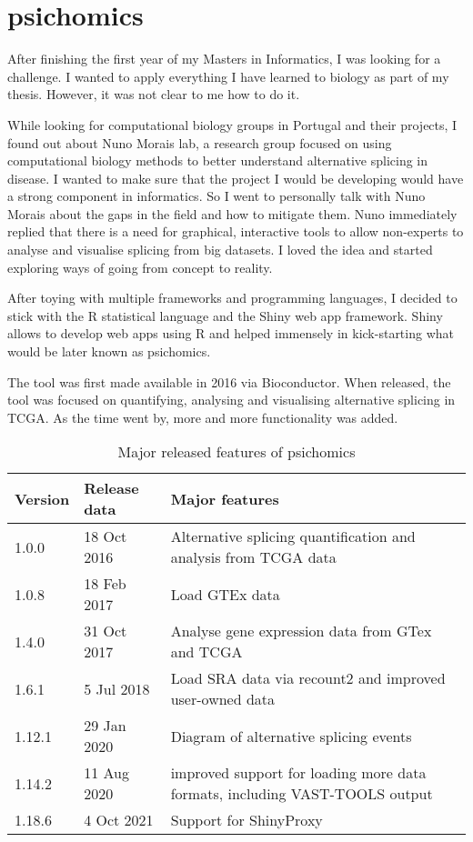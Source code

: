 \chapter{psichomics}

After finishing the first year of my Masters in Informatics, I was looking for a challenge. I wanted to apply everything I have learned to biology as part of my thesis. However, it was not clear to me how to do it.

While looking for computational biology groups in Portugal and their projects, I found out about Nuno Morais lab, a research group focused on using computational biology methods to better understand alternative splicing in disease. I wanted to make sure that the project I would be developing would have a strong component in informatics. So I went to personally talk with Nuno Morais about the gaps in the field and how to mitigate them. Nuno immediately replied that there is a need for graphical, interactive tools to allow non-experts to analyse and visualise splicing from big datasets. I loved the idea and started exploring ways of going from concept to reality.

After toying with multiple frameworks and programming languages, I decided to stick with the R statistical language and the Shiny web app framework. Shiny allows to develop web apps using R and helped immensely in kick-starting what would be later known as psichomics.

The tool was first made available in 2016 via Bioconductor. When released, the tool was focused on quantifying, analysing and visualising alternative splicing in TCGA. As the time went by, more and more functionality was added.

\begin{table}
\caption{Major released features of psichomics}
\label{tab:psichomics}
\begin{tabularx}{\textwidth}{ l l X }
\toprule
\textbf{Version} & \textbf{Release data} & \textbf{Major features} \\
\midrule
1.0.0  & 18 Oct 2016 & Alternative splicing quantification and analysis from TCGA data \\
1.0.8  & 18 Feb 2017 & Load GTEx data \\
1.4.0  & 31 Oct 2017 & Analyse gene expression data from GTex and TCGA \\
1.6.1  & 5 Jul 2018  & Load SRA data via recount2 and improved user-owned data \\
1.12.1 & 29 Jan 2020 & Diagram of alternative splicing events \\
1.14.2 & 11 Aug 2020 & improved support for loading more data formats, including VAST-TOOLS output \\
1.18.6 & 4 Oct 2021  & Support for ShinyProxy \\                                                  
\bottomrule
\end{tabularx}
\end{table}

